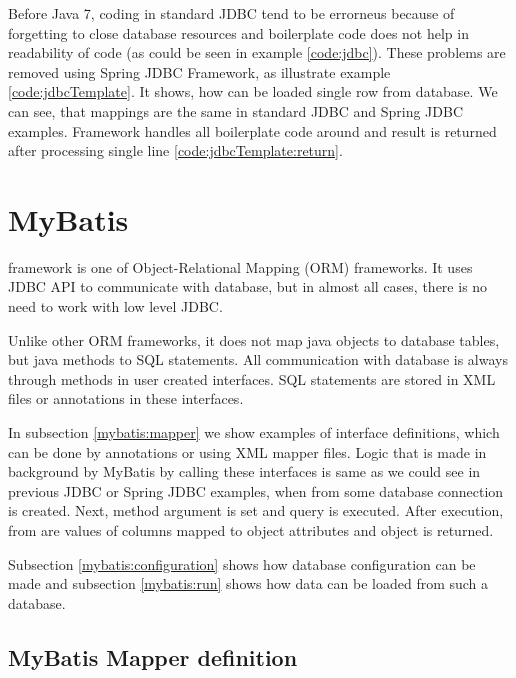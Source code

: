 Before Java 7, coding in standard JDBC tend to be errorneus because of forgetting to close
database resources and boilerplate code does not help in readability of code
(as could be seen in example \ref{code:jdbc}). These problems are removed using Spring JDBC Framework,
as illustrate example \ref{code:jdbcTemplate}. It shows, how can be loaded single row from database.
We can see, that mappings are the same in standard JDBC and Spring JDBC examples.
Framework handles all boilerplate code around and result is returned after processing single line \ref{code:jdbcTemplate:return}.







\section{MyBatis \label{frameworks:myBatis}}

\citet{MyBatis} framework is one of Object-Relational Mapping (ORM) frameworks.
It uses JDBC API to communicate with database, but in almost all cases, there is no need
to work with low level JDBC.

Unlike other ORM frameworks, it does not map java objects to database tables, but java methods
to SQL statements. All communication with database is always through methods in user created interfaces.
SQL statements are stored in XML files or annotations in these interfaces.

In subsection \ref{mybatis:mapper} we show examples of  interface definitions,
which can be done by annotations or using XML mapper files.
Logic that is made in background by MyBatis by calling these interfaces
is same as we could see in previous JDBC or Spring JDBC examples,
when from some database connection  is created.
Next, method argument  is set and query is executed.
After execution, from  are values of columns
mapped to object attributes and object is returned.

Subsection \ref{mybatis:configuration} shows how database
configuration can be made and subsection \ref{mybatis:run}
shows how data can be loaded from such a database.



\subsection{MyBatis Mapper definition \label{mybatis:mapper}}

